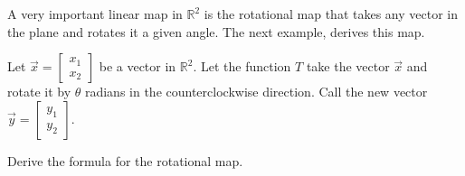 A very important linear map in $\mathbb{R}^2$ is the rotational map that takes any vector in the plane and rotates it a given angle.  The next example, derives this map. 

\begin{example} \label{ex:rotational:trans}
 Let $\displaystyle \vec{x} = 
\begin{bmatrix}
 x_1 \\ x_2 
\end{bmatrix}$ be a vector in $\mathbb{R}^2$.  Let the function $T$ take the vector $\vec{x}$ and rotate it by $\theta$ radians in the counterclockwise direction.  Call the new vector $\displaystyle \vec{y} = 
\begin{bmatrix}
 y_1 \\ y_2
\end{bmatrix}$.  

\begin{center}
\end{center}

Derive the formula for the rotational map. 

\solution


\end{example}
